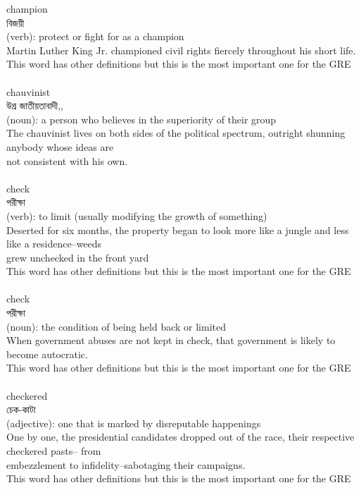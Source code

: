 \documentclass{article}
\begin{document}
{champion}\\
{বিজয়ী}\\
{(verb): protect or fight for as a champion\\Martin Luther King Jr. championed civil rights fiercely throughout his short life.\\This word has other definitions but this is the most important one for the GRE\\}\\
{chauvinist}\\
{উগ্র জাতীয়তাবাদী,,}\\
{(noun): a person who believes in the superiority of their group\\The chauvinist lives on both sides of the political spectrum, outright shunning anybody whose ideas are\\not consistent with his own.\\}\\
{check}\\
{পরীক্ষা}\\
{(verb): to limit (usually modifying the growth of something)\\Deserted for six months, the property began to look more like a jungle and less like a residence--weeds\\grew unchecked in the front yard\\This word has other definitions but this is the most important one for the GRE\\}\\
{check}\\
{পরীক্ষা}\\
{(noun): the condition of being held back or limited\\When government abuses are not kept in check, that government is likely to become autocratic.\\This word has other definitions but this is the most important one for the GRE\\}\\
{checkered}\\
{চেক-কাটা}\\
{(adjective): one that is marked by disreputable happenings\\One by one, the presidential candidates dropped out of the race, their respective checkered pasts-- from\\embezzlement to infidelity--sabotaging their campaigns.\\This word has other definitions but this is the most important one for the GRE\\}\\
\end{document}
